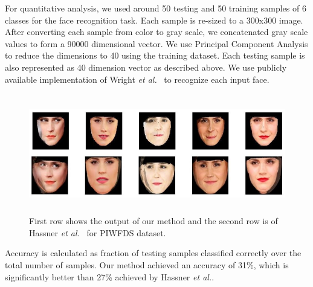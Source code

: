 For quantitative analysis, we used around 50 testing and 50 training samples of 6 classes for the face
recognition task. Each sample is re-sized to a 300x300 image. After converting each sample from color
to gray scale, we concatenated gray scale values to form a 90000 dimensional vector. We use
Principal Component Analysis to reduce the dimensions to 40 using the training dataset. Each
testing sample is also represented as 40 dimension vector as described above. We use publicly
available implementation of Wright {\em et al.}~\cite{Wright:2009:RFR:1495801.1496037}  to recognize
each input face. 

\begin{figure}
\begin{center}\includegraphics[width =13cm,height=5.2cm]{front/figures/qualitative_result_2.png}\end{center}
\caption{First row shows the output of our method and the second row is of Hassner {\em et al.}~\cite{DBLP:journals/corr/HassnerHPE14} for PIWFDS dataset.}
\label{fig:qualitative_result2}
\end{figure}

Accuracy is calculated as fraction of testing samples classified correctly over the total number of samples. Our method achieved an accuracy of 31\%, which is significantly better than 27\% achieved by Hassner {\em et al.}.

